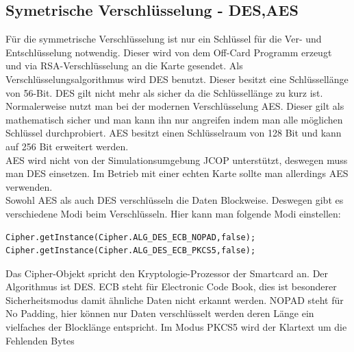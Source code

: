 \documentclass[parskip]{scrartcl}
\begin{document}
\subsection{Symetrische Verschlüsselung - DES,AES}
Für die symmetrische Verschlüsselung ist nur ein Schlüssel für die Ver- und Entschlüsselung notwendig. Dieser wird von dem Off-Card Programm erzeugt und via RSA-Verschlüsselung an die Karte gesendet. Als Verschlüsselungsalgorithmus wird DES benutzt. Dieser besitzt eine Schlüssellänge von 56-Bit. DES gilt nicht mehr als sicher da die Schlüssellänge zu kurz ist. Normalerweise nutzt man bei der modernen Verschlüsselung AES. Dieser gilt als mathematisch sicher und man kann ihn nur angreifen indem man alle möglichen Schlüssel durchprobiert. AES besitzt einen Schlüsselraum von 128 Bit und kann auf 256 Bit erweitert werden.\\ 
AES wird nicht von der Simulationsumgebung JCOP unterstützt, deswegen muss man DES einsetzen. Im Betrieb mit einer echten Karte sollte man allerdings AES verwenden.\\
Sowohl AES als auch DES verschlüsseln die Daten Blockweise. Deswegen gibt es verschiedene Modi beim Verschlüsseln. Hier kann man folgende Modi einstellen:
\begin{lstlisting}
Cipher.getInstance(Cipher.ALG_DES_ECB_NOPAD,false);
Cipher.getInstance(Cipher.ALG_DES_ECB_PKCS5,false);
\end{lstlisting}
Das Cipher-Objekt spricht den Kryptologie-Prozessor der Smartcard an. Der Algorithmus ist DES. ECB steht für Electronic Code Book, dies ist besonderer Sicherheitsmodus damit ähnliche Daten nicht erkannt werden. NOPAD steht für No Padding, hier können nur Daten verschlüsselt werden deren Länge ein vielfaches der Blocklänge entspricht. Im Modus PKCS5 wird der Klartext um die Fehlenden Bytes 
\end{document}
